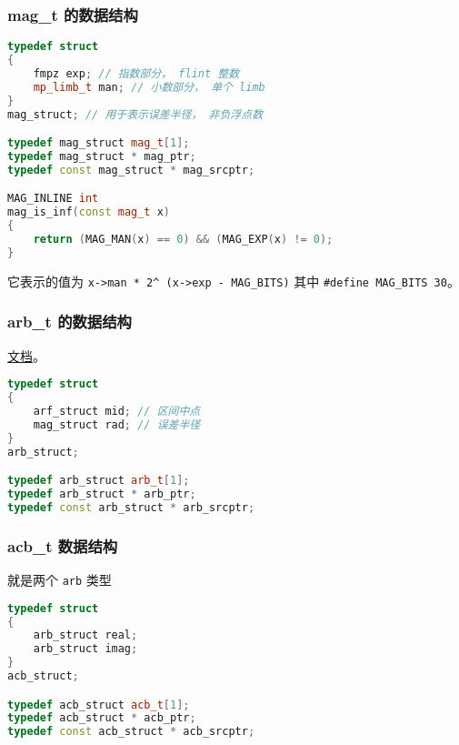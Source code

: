 \subsubsection{mag\_t 的数据结构}
\begin{lstlisting}[language=cpp]
typedef struct
{
    fmpz exp; // 指数部分， flint 整数
    mp_limb_t man; // 小数部分， 单个 limb
}
mag_struct; // 用于表示误差半径， 非负浮点数

typedef mag_struct mag_t[1];
typedef mag_struct * mag_ptr;
typedef const mag_struct * mag_srcptr;

MAG_INLINE int
mag_is_inf(const mag_t x)
{
    return (MAG_MAN(x) == 0) && (MAG_EXP(x) != 0);
}
\end{lstlisting}

它表示的值为 \verb`x->man * 2^ (x->exp - MAG_BITS)` 其中 \verb`#define MAG_BITS 30`。 %

\subsubsection{arb\_t 的数据结构}
\href{https://arblib.org/arb.html}{文档}。

\begin{lstlisting}[language=cpp]
typedef struct
{
    arf_struct mid; // 区间中点
    mag_struct rad; // 误差半径
}
arb_struct;

typedef arb_struct arb_t[1];
typedef arb_struct * arb_ptr;
typedef const arb_struct * arb_srcptr;
\end{lstlisting}

\subsubsection{acb\_t 数据结构}
就是两个 \verb`arb` 类型
\begin{lstlisting}[language=cpp]
typedef struct
{
    arb_struct real;
    arb_struct imag;
}
acb_struct;

typedef acb_struct acb_t[1];
typedef acb_struct * acb_ptr;
typedef const acb_struct * acb_srcptr;
\end{lstlisting}
